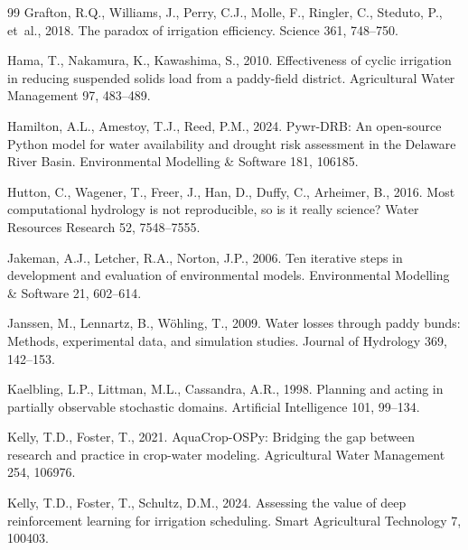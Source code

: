 \documentclass[preprint,12pt,authoryear,review]{elsarticle}
\begin{document}
\begin{thebibliography}{99}
Grafton, R.Q., Williams, J., Perry, C.J., Molle, F., Ringler, C., Steduto, P., et~al., 2018. The paradox of irrigation efficiency. Science 361, 748--750. 

Hama, T., Nakamura, K., Kawashima, S., 2010. Effectiveness of cyclic irrigation in reducing suspended solids load from a paddy-field district. Agricultural Water Management 97, 483--489. 

Hamilton, A.L., Amestoy, T.J., Reed, P.M., 2024. Pywr-DRB: An open-source Python model for water availability and drought risk assessment in the Delaware River Basin. Environmental Modelling \& Software 181, 106185. 

Hutton, C., Wagener, T., Freer, J., Han, D., Duffy, C., Arheimer, B., 2016. Most computational hydrology is not reproducible, so is it really science? Water Resources Research 52, 7548--7555. 

Jakeman, A.J., Letcher, R.A., Norton, J.P., 2006. Ten iterative steps in development and evaluation of environmental models. Environmental Modelling \& Software 21, 602--614. 

Janssen, M., Lennartz, B., W\"ohling, T., 2009. Water losses through paddy bunds: Methods, experimental data, and simulation studies. Journal of Hydrology 369, 142--153. 

Kaelbling, L.P., Littman, M.L., Cassandra, A.R., 1998. Planning and acting in partially observable stochastic domains. Artificial Intelligence 101, 99--134. 

Kelly, T.D., Foster, T., 2021. AquaCrop-OSPy: Bridging the gap between research and practice in crop-water modeling. Agricultural Water Management 254, 106976. 

Kelly, T.D., Foster, T., Schultz, D.M., 2024. Assessing the value of deep reinforcement learning for irrigation scheduling. Smart Agricultural Technology 7, 100403. 


\end{thebibliography}
\end{document}

